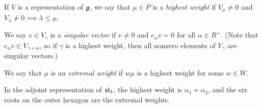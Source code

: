 \begin{definition}
If $V$ is a representation of $\g$, we say that $\mu \in P$ is a \emph{highest
weight} if $V_\mu \neq 0$ and $V_\lambda \neq 0 \implies \lambda \leq \mu$.

We say $v \in V_\gamma$ is a \emph{singular vector} if $v \neq 0$ and
$e_\alpha v = 0$ for all $\alpha \in R^+$. (Note that
$e_\alpha v \in V_{\gamma+\alpha}$, so if $\gamma$ is a highest weight, then
all nonzero elements of $V_\gamma$ are singular vectors.)

We say that $\mu$ is an \emph{extremal weight} if $w\mu$ is a highest weight
for some $w \in W$.
\end{definition}

\begin{example}
In the adjoint representation of $\sl_3$, the highest weight is
$\alpha_1 + \alpha_2$, and the six roots on the outer hexagon are the extremal
weights.
\end{example}

